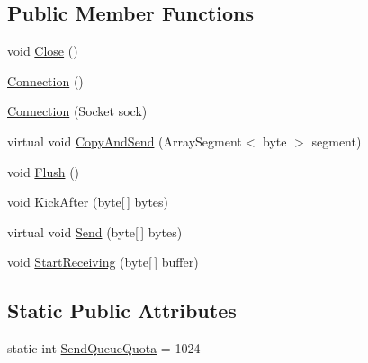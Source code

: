 \subsection*{Public Member Functions}
\begin{DoxyCompactItemize}
\item 
void \hyperlink{classOTA_1_1Sockets_1_1Connection_a7f7a3199c392465d0767c6506c1af5b4}{Close} ()
\item 
\hyperlink{classOTA_1_1Sockets_1_1Connection_a346f4774f29e17e14e9b39fa9e2165e3}{Connection} ()
\item 
\hyperlink{classOTA_1_1Sockets_1_1Connection_a8422a813eaaa5721ddecbc84c54093b1}{Connection} (Socket sock)
\item 
virtual void \hyperlink{classOTA_1_1Sockets_1_1Connection_a0077d74a257769f4d11cb190cb8bf923}{Copy\+And\+Send} (Array\+Segment$<$ byte $>$ segment)
\item 
void \hyperlink{classOTA_1_1Sockets_1_1Connection_a0e2644b2df3c228e8d71a55b60723f31}{Flush} ()
\item 
void \hyperlink{classOTA_1_1Sockets_1_1Connection_af61bb3d5bb81c1a6af6166560bf35e70}{Kick\+After} (byte\mbox{[}$\,$\mbox{]} bytes)
\item 
virtual void \hyperlink{classOTA_1_1Sockets_1_1Connection_a907eb0a7ebcc2b69c7cb6c09a8788a2e}{Send} (byte\mbox{[}$\,$\mbox{]} bytes)
\item 
void \hyperlink{classOTA_1_1Sockets_1_1Connection_ae819c98b2fd576dd8bcb8ecb9f056fda}{Start\+Receiving} (byte\mbox{[}$\,$\mbox{]} buffer)
\end{DoxyCompactItemize}
\subsection*{Static Public Attributes}
\begin{DoxyCompactItemize}
\item 
static int \hyperlink{classOTA_1_1Sockets_1_1Connection_a1c14b7182bb1d2e97ab85dc0e4b14061}{Send\+Queue\+Quota} = 1024
\end{DoxyCompactItemize}

